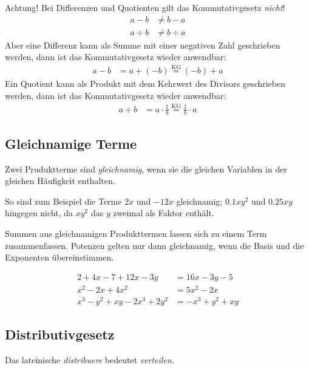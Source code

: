 Achtung! Bei Differenzen und Quotienten gilt das Kommutativgesetz \emph{nicht}!
\begin{align*}
 a-b &\ne b-a\\
 a\div b &\ne b\div a
\end{align*}
Aber eine Differenz kann als Summe mit einer negativen Zahl geschrieben werden, dann ist das Kommutativgesetz wieder anwendbar:
\begin{align*}
 a-b &= a+(-b) \stackrel{\text{KG}}{=} (-b)+a
\end{align*}
Ein Quotient kann als Produkt mit dem Kehrwert des Divisors geschrieben werden, dann ist das Kommutativgesetz wieder anwendbar:
\begin{align*}
 a\div b &= a\cdot \frac{1}{b} \stackrel{\text{KG}}{=} \frac{1}{b}\cdot a
\end{align*}


\subsection*{Gleichnamige Terme}
Zwei Pruduktterme sind \emph{gleichnamig}, wenn sie die gleichen Variablen in der gleichen Häufigkeit enthalten.

So sind zum Beispiel die Terme \(2x\) und \(-12x\) gleichnamig; \(0.1xy^2\) und \(0.25xy\) hingegen nicht, da \(xy^2\) das \(y\) zweimal als Faktor enthält.

\begin{regel}
 Summen aus gleichnamigen Produkttermen lassen sich zu einem Term zusammenfassen.
 Potenzen gelten nur dann gleichnamig, wenn die Basis und die Exponenten übereinstimmen.
 \end{regel}

\begin{bsp}
 \begin{align*}
  2+4x-7+12x-3y &= 16x-3y-5 \\
  x^2-2x+4x^2 &= 5x^2 -2x \\
  x^3 - y^2 + xy -2x^3 +2y^2 &= -x^3+y^2 +xy 
 \end{align*}

\end{bsp}


\subsection*{Distributivgesetz}
\label{ssec:dis}

Das lateinische \emph{distribuere} bedeutet \emph{verteilen}.

